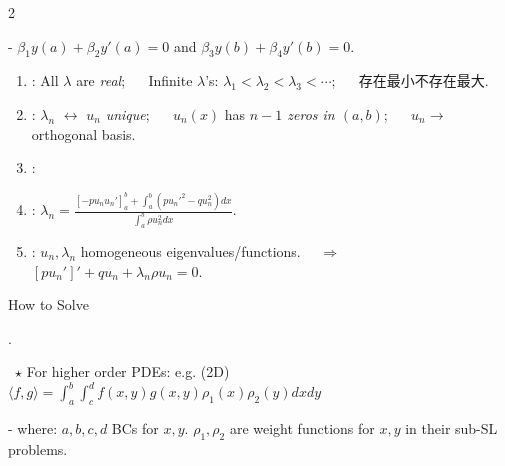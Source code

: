 \documentclass{note}
\begin{document}
\begin{multicols}{2}
{{\begin{MyTh}{}
        \vspace{2pt} 
        \qquad - $\beta_1 y(a) + \beta_2 y'(a)=0$ and $\beta_3 y(b) + \beta_4 y'(b)=0$.

        \vspace{-2pt}
        \begin{enumerate}
            \item {}:  All $\lambda$ are \textit{real}; \ \  Infinite $\lambda$'s: $\lambda_1<\lambda_2<\lambda_3<\cdots$; \ \  存在最小不存在最大.
            \vspace{-2pt}
            \item {}:  $\lambda_n$ $\leftrightarrow$ $u_n$ \textit{unique}; \ \  $u_n(x)$ has \textit{$n-1$ zeros in $(a,b)$}; \ \  $u_n \to$ orthogonal basis.
            \item {}: 
            \vspace{-5pt}
            \item {}: $\lambda_n = \frac{ [-pu_n u_n']_a^b + \int_a^b (p u_n'^2 - q u_n^2) dx}{\int_a^b \rho u_n^2 dx}$.
            \item {}: $u_n,\lambda_n$ homogeneous eigenvalues/functions. \ \ $\Rightarrow$ \ \ $[pu_n']' + q u_n + \lambda_n \rho u_n=0$.
        \end{enumerate}
    \end{MyTh}

    \begin{MyTh}{How to Solve} \tiny

        \quad {}.

        \ $\star$ For higher order PDEs: e.g. (2D) $\langle f,g\rangle = \int_a^b \int_{c}^d f(x,y)g(x,y)\rho_{1}(x)\rho_{2}(y) dxdy$ \qquad {}

        \quad \quad - where:  $a,b,c,d$ BCs for $x,y$. \quad {} $\rho_1,\rho_2$ are weight functions for $x,y$ in their sub-SL problems.


\end{MyTh}}}
\end{multicols}
\end{document}
